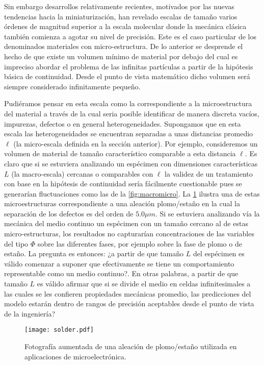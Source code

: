 \documentclass[../notas medios.tex]{subfiles}
\begin{document}
Sin embargo desarrollos relativamente recientes, motivados por las nuevas tendencias hacia la miniaturización, han revelado escalas de tamaño varios órdenes de magnitud superior a la escala molecular donde la mecánica clásica también comienza a agotar su nivel de precisión.  Este es el caso particular de los denominados materiales con micro-estructura.  De lo anterior se desprende el hecho de que existe un volumen mínimo de material por debajo del cual es impreciso abordar el problema de las infinitas partículas a partir de la hipótesis básica de continuidad.  Desde el punto de vista matemático dicho volumen será siempre considerado infinitamente pequeño.

Pudiéramos pensar en esta escala como la correspondiente a la microestructura
del material a través de la cual seria posible identificar de manera discreta
vacíos, impurezas, defectos o en general heterogeneidades.  Supongamos que en 
esta escala las heterogeneidades se encuentran separadas a unas distancias 
promedio $\ell$  (la micro-escala definida en la sección anterior).  Por 
ejemplo, consideremos un volumen de material de tamaño característico 
comparable a esta distancia $\ell$.  Es claro que si se estuviera analizando un 
espécimen con dimensiones características $L$ (la macro-escala) cercanas o 
comparables con $\ell$ la validez de un tratamiento con base en la hipótesis de 
continuidad sería fácilmente cuestionable pues se generarían fluctuaciones como 
las de la \cref{fig:macromicro}.  La \cref{fig:solder} ilustra una de estas 
microestructuras correspondiente a una aleación plomo/estaño en la cual la 
separación de los defectos es del orden de $5.0 \mu m$.  Si se estuviera 
analizando vía la mecánica del medio continuo un espécimen con un tamaño 
cercano al de estas micro-estructuras, los resultados no capturarían 
concentraciones de las variables del tipo $\Phi$ sobre las diferentes fases, 
por ejemplo sobre la fase de plomo o de estaño.  La pregunta es entonces: ¿a 
partir de que tamaño $L$ del espécimen es válido comenzar a suponer que 
efectivamente se tiene un comportamiento representable como un medio 
continuo?.  En otras palabras, a partir de que tamaño $L$ es válido afirmar que 
si se divide el medio en celdas infinitesimales a las cuales se les confieren 
propiedades mecánicas promedio, las predicciones del modelo estarán dentro de 
rangos de precisión aceptables desde el punto de vista de la ingeniería?

\begin{figure}[H]
\centering
\texttt{[image: solder.pdf]}
\caption{Fotografía aumentada de una aleación de plomo/estaño utilizada en 
aplicaciones de microelectrónica.}
\label{fig:solder}
\end{figure}
\end{document}
